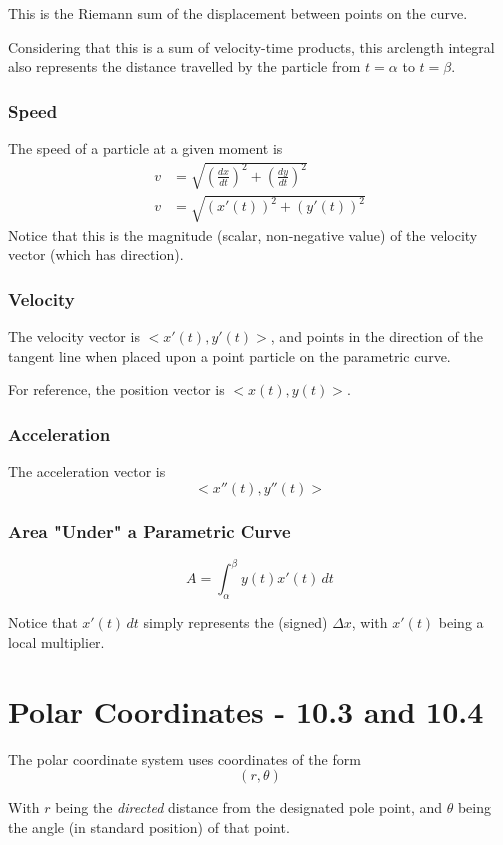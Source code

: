\documentclass{article}
\begin{document}
This is the Riemann sum of the displacement between points on the curve.

Considering that this is a sum of velocity-time products, this arclength integral also represents the distance travelled by the particle from $t=\alpha$ to $t=\beta$.

\subsubsection{Speed}
The speed of a particle at a given moment is
\begin{align*}
    v &= \sqrt{\left(\frac{dx}{dt}\right)^2 + \left(\frac{dy}{dt}\right)^2} \\
    v &= \sqrt{(x'(t))^2 + (y'(t))^2}
\end{align*}
Notice that this is the magnitude (scalar, non-negative value) of the velocity vector (which has direction).

\subsubsection{Velocity}
The velocity vector is $<x'(t), y'(t)>$, and points in the direction of the tangent line when placed upon a point particle on the parametric curve.

For reference, the position vector is $<x(t), y(t)>$.

\subsubsection{Acceleration}
The acceleration vector is
$$<x''(t), y''(t)>$$

\subsubsection{Area "Under" a Parametric Curve}
$$A = \int_{\alpha}^{\beta} y(t) x'(t) \,dt$$

Notice that $x'(t) \,dt$ simply represents the (signed) $\Delta x$, with $x'(t)$ being a local multiplier.

\section{Polar Coordinates - 10.3 and 10.4}
The polar coordinate system uses coordinates of the form
$$(r, \theta)$$

With $r$ being the \emph{directed} distance from the designated pole point, and $\theta$ being the angle (in standard position) of that point.
\end{document}
